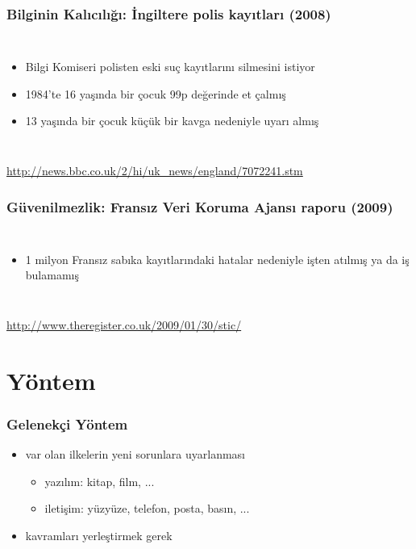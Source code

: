 \documentclass[dvipsnames]{beamer}
\theoremstyle{definition}
\theoremstyle{example}
\theoremstyle{plain}
\begin{document}
\begin{frame}
  \frametitle{Bilginin Kalıcılığı: İngiltere polis kayıtları (2008)}

  \begin{columns}

    \begin{itemize}
      \item Bilgi Komiseri polisten eski suç kayıtlarını silmesini istiyor

      \medskip
      \item 1984'te 16 yaşında bir çocuk 99p değerinde et çalmış
      \item 13 yaşında bir çocuk küçük bir kavga nedeniyle uyarı almış
    \end{itemize}
  \end{columns}

  \medskip
  \tiny{\url{http://news.bbc.co.uk/2/hi/uk_news/england/7072241.stm}}
\end{frame}

\begin{frame}
  \frametitle{Güvenilmezlik: Fransız Veri Koruma Ajansı raporu (2009)}

  \begin{columns}

    \begin{itemize}
      \item 1 milyon Fransız sabıka kayıtlarındaki hatalar nedeniyle işten
        atılmış ya da iş bulamamış
    \end{itemize}
  \end{columns}

  \medskip
  \tiny{\url{http://www.theregister.co.uk/2009/01/30/stic/}}
\end{frame}

\section{Yöntem}

\begin{frame}
  \frametitle{Gelenekçi Yöntem}

  \begin{itemize}
    \item var olan ilkelerin yeni sorunlara uyarlanması
    \begin{itemize}
      \item yazılım: kitap, film, ...
      \item iletişim: yüzyüze, telefon, posta, basın, ...
    \end{itemize}

    \pause
    \bigskip
    \item kavramları yerleştirmek gerek
  \end{itemize}
\end{frame}
\end{document}

